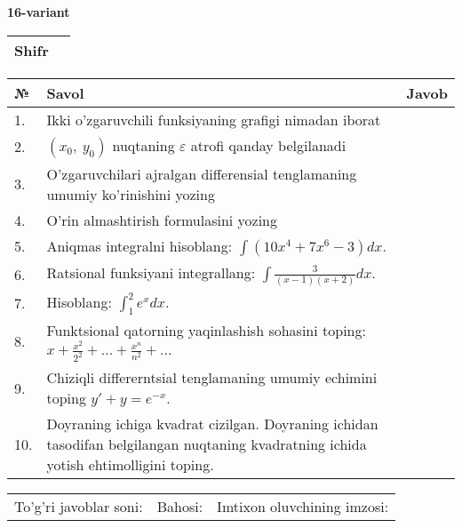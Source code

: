 \documentclass{article}
\begin{document}
  \egroup
  
  \newpage
  
  
  \textbf{16-variant}\\
  
  \bgroup
  \def\arraystretch{1.6} %
  
  \begin{tabular}{|m{5.7cm}|m{9.5cm}|}
  \hline
  Shifr & \\
  \hline
  \end{tabular}
  
  \vspace{1cm}
  
  \begin{tabular}{|m{0.7cm}|m{10cm}|m{4cm}|}
  \hline
  № & Savol & Javob \\
  \hline
  1. & Ikki o'zgaruvchili funksiyaning grafigi nimadan iborat &  \\
  \hline
  2. & \((x_{0},\ y_{0})\) nuqtaning \(\varepsilon\) atrofi qanday belgilanadi &  \\
  \hline
  3. & O'zgaruvchilari ajralgan differensial tenglamaning umumiy ko'rinishini yozing &  \\
  \hline
  4. & O'rin almashtirish formulasini yozing &  \\
  \hline
  5. & Aniqmas integralni hisoblang: \(\int {\left( 10x^{4} + 7x^{6} - 3 \right)dx}\). &  \\
  \hline
  6. & Ratsional funksiyani integrallang: \(\int {\frac{3}{(x - 1)(x + 2)}dx}\). &  \\
  \hline
  7. & Hisoblang: \(\int_{1}^{2}{e^{x}dx}\). &  \\
  \hline
  8. & Funktsional qatorning yaqinlashish sohasini toping: \(x + \frac{x^{2}}{2^{2}} + ... + \frac{x^{n}}{n^{2}} + ...\) &  \\
  \hline
  9. & Chiziqli differerntsial tenglamaning umumiy echimini toping \(y' + y = e^{- x}\). &  \\
  \hline
  10. & Doyraning ichiga kvadrat cizilgan. Doyraning ichidan tasodifan belgilangan nuqtaning kvadratning ichida yotish ehtimolligini toping. &  \\
  \hline
  \end{tabular}
  
  \vspace{1cm}
  
  \begin{tabular}{lll}
  To'g'ri javoblar soni: \underline{\hspace{1.5cm}} & 
  Bahosi: \underline{\hspace{1.5cm}} & 
  Imtixon oluvchining imzosi: \underline{\hspace{2cm}} \\
  \end{tabular}
  
\end{document}
